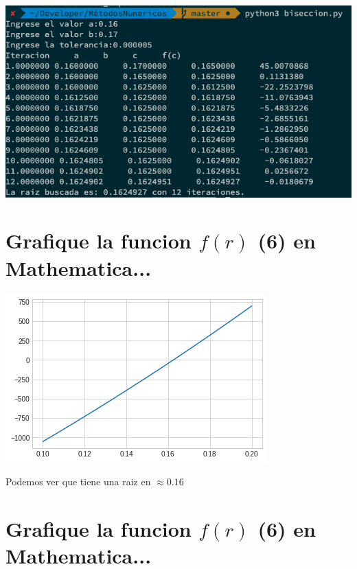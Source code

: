 \documentclass{article}
\begin{document}
\includegraphics[scale=0.5]{salidaBiseccion.png}


\section{Grafique la funcion $f(r)$ (6) en Mathematica...}
\begin{center}
\includegraphics[scale=0.5]{plot.png}
\end{center}

Podemos ver que tiene una raiz en $\approx 0.16$

\section{Grafique la funcion $f(r)$ (6) en Mathematica...}
\end{document}
